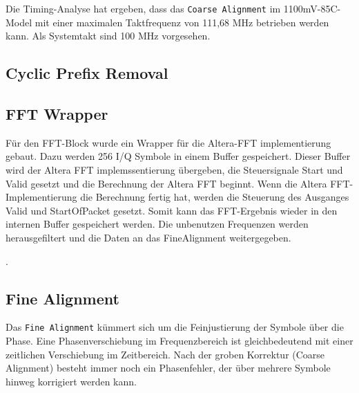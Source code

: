 Die Timing-Analyse hat ergeben, dass das \texttt{Coarse Alignment} im 1100mV-85C-Model mit einer maximalen Taktfrequenz von 111,68 MHz betrieben werden kann. Als Systemtakt sind 100 MHz vorgesehen.

\subsection{Cyclic Prefix Removal}

\subsection{FFT Wrapper}
Für den FFT-Block  wurde ein Wrapper für die Altera-FFT implementierung gebaut. Dazu werden 256 I/Q Symbole in einem Buffer gespeichert. Dieser Buffer wird der Altera FFT implemssentierung übergeben, die Steuersignale Start und Valid gesetzt und die Berechnung der Altera FFT beginnt. Wenn die Altera FFT-Implementierung die Berechnung fertig hat, werden die Steuerung des Ausganges Valid und StartOfPacket gesetzt. Somit kann das FFT-Ergebnis wieder in den internen Buffer gespeichert werden. Die unbenutzen Frequenzen werden herausgefiltert und die Daten an das FineAlignment weitergegeben.

.


\subsection{Fine Alignment}

Das \texttt{Fine Alignment} kümmert sich um die Feinjustierung der Symbole über die Phase. Eine Phasenverschiebung im Frequenzbereich ist gleichbedeutend mit einer zeitlichen Verschiebung im Zeitbereich. Nach der groben Korrektur (Coarse Alignment) besteht immer noch ein Phasenfehler, der über mehrere Symbole hinweg korrigiert werden kann.\\
\\


